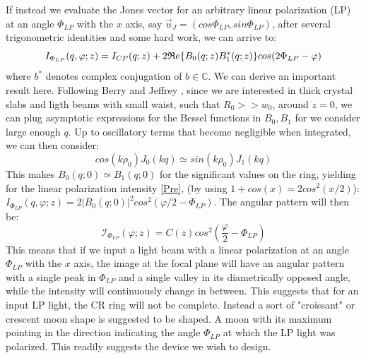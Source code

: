 \documentclass[11pt, a4paper, twoside]{article} %
\newcommand{\C}{\mathbb{C}}
\begin{document}
If instead we evaluate the Jones vector for an arbitrary linear polarization (LP) at an angle $\Phi_{LP}$ with the $x$ axis, say $\vec{u}_J=(cos\Phi_{LP}, sin\Phi_{LP})$, after several trigonometric identities and some hard work, we can arrive to:
\begin{equation}\label{Pre}
I_{\Phi_{LP}}(q,\varphi;z)=I_{CP}(q;z)+2\mathfrak{R}e\qty{B_0(q;z)B_1^*(q;z)}cos(2\Phi_{LP}-\varphi)
\end{equation}
where $b^*$ denotes complex conjugation of $b\in\C$. We can derive an important result here. Following Berry and Jeffrey \cite{Berry, BerryJeffrey, Jeffrey}, since we are interested in thick crystal slabs and ligth beams with small waist, such that $R_0>>w_0$, around $z=0$, we can plug asymptotic expressions for the Bessel functions in $B_0,B_1$ for we consider large enough $q$. Up to oscillatory terms that become negligible when integrated, we can then consider:
\begin{equation}
cos(k\rho_0)J_0(kq)\simeq sin(k\rho_0)J_1(kq)
\end{equation}
This makes $B_0(q;0)\simeq B_1(q;0)$ for the significant values on the ring, yielding for the linear polarization intensity \eqref{Pre}, (by using $1+cos(x)=2cos^2(x/2)$): $I_{\Phi_{LP}}(q,\varphi;z)=2|B_0(q;0)|^2cos^2(\varphi/2-\Phi_{LP})$. The angular pattern will then be:
\begin{equation}\label{cosine}
\mathcal{I}_{\Phi_{LP}}(\varphi;z)=C(z)cos^2(\frac{\varphi}{2}-\Phi_{LP})
\end{equation}
This means that if we input a light beam with a linear polarization at an angle $\Phi_{LP}$ with the $x$ axis, the image at the focal plane will have an angular pattern with a single peak in $\Phi_{LP}$ and a single valley in its diametrically opposed angle, while the intensity will continuously change in between. This suggests that for an input LP light, the CR ring will not be complete. Instead a sort of "croissant" or crescent moon shape is suggested to be shaped. A moon with its maximum pointing in the direction indicating the angle $\Phi_{LP}$ at which the LP light was polarized. This readily suggests the device we wish to design.
\end{document}
